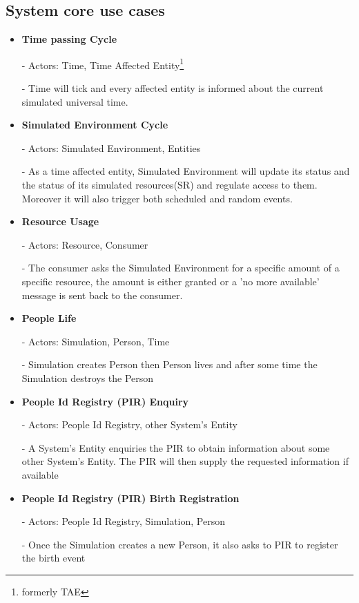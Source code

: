 \subsection{System core use cases}
\begin{itemize}
  \item \textbf{Time passing Cycle}  
	
	- Actors: Time, Time Affected Entity\footnote{formerly TAE}

	- Time will tick and every affected entity is informed about the current
simulated universal time.

  \item \textbf{Simulated Environment Cycle}

	- Actors: Simulated Environment, Entities

	- As a time affected entity, Simulated Environment will update its
status and the status of its simulated resources(SR) and regulate access to
them. Moreover it will also trigger both scheduled and random events.

  \item \textbf{Resource Usage}

	- Actors: Resource, Consumer

	- The consumer asks the Simulated Environment for a specific amount of a
specific resource, the amount is either granted or a 'no more available' message
is sent back to the consumer.

  \item \textbf{People Life} 

	- Actors: Simulation, Person, Time

	- Simulation creates Person then Person lives and after some time the
Simulation destroys the Person

  \item \textbf{People Id Registry (PIR) Enquiry}

	- Actors: People Id Registry, other System's Entity

	- A System's Entity enquiries the PIR to obtain information about some
other System's Entity. The PIR will then supply the requested information  if
available

  \item \textbf{People Id Registry (PIR) Birth Registration}

	- Actors: People Id Registry, Simulation, Person

	- Once the Simulation creates a new Person, it also asks to PIR to
register the birth event


\end{itemize}
